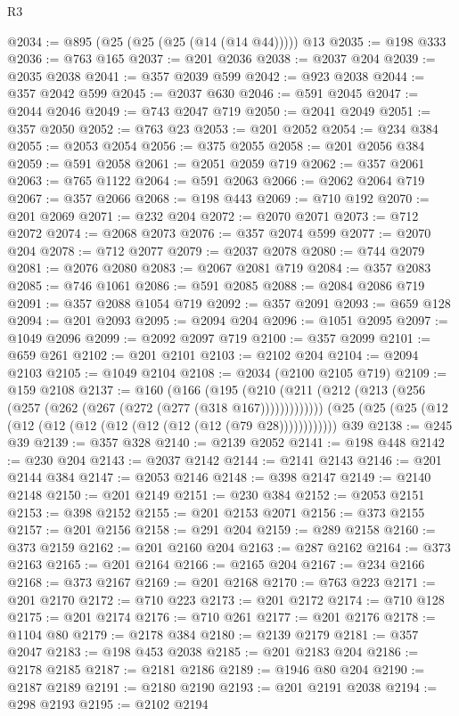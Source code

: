 \begin{lexlean}{R3}
\begin{coremodule}
@2034 := @895 (@25 (@25 (@25 (@14 (@14 @44))))) @13
@2035 := @198 @333
@2036 := @763 @165
@2037 := @201 @2036
@2038 := @2037 @204
@2039 := @2035 @2038
@2041 := @357 @2039 @599
@2042 := @923 @2038
@2044 := @357 @2042 @599
@2045 := @2037 @630
@2046 := @591 @2045
@2047 := @2044 @2046
@2049 := @743 @2047 @719
@2050 := @2041 @2049
@2051 := @357 @2050
@2052 := @763 @23
@2053 := @201 @2052
@2054 := @234 @384
@2055 := @2053 @2054
@2056 := @375 @2055
@2058 := @201 @2056 @384
@2059 := @591 @2058
@2061 := @2051 @2059 @719
@2062 := @357 @2061
@2063 := @765 @1122
@2064 := @591 @2063
@2066 := @2062 @2064 @719
@2067 := @357 @2066
@2068 := @198 @443
@2069 := @710 @192
@2070 := @201 @2069
@2071 := @232 @204
@2072 := @2070 @2071
@2073 := @712 @2072
@2074 := @2068 @2073
@2076 := @357 @2074 @599
@2077 := @2070 @204
@2078 := @712 @2077
@2079 := @2037 @2078
@2080 := @744 @2079
@2081 := @2076 @2080
@2083 := @2067 @2081 @719
@2084 := @357 @2083
@2085 := @746 @1061
@2086 := @591 @2085
@2088 := @2084 @2086 @719
@2091 := @357 @2088 @1054 @719
@2092 := @357 @2091
@2093 := @659 @128
@2094 := @201 @2093
@2095 := @2094 @204
@2096 := @1051 @2095
@2097 := @1049 @2096
@2099 := @2092 @2097 @719
@2100 := @357 @2099
@2101 := @659 @261
@2102 := @201 @2101
@2103 := @2102 @204
@2104 := @2094 @2103
@2105 := @1049 @2104
@2108 := @2034 (@2100 @2105 @719)
@2109 := @159 @2108
@2137 := @160
    (@166 (@195 (@210 (@211 (@212 (@213 (@256 (@257 (@262 (@267 (@272 (@277 (@318 @167)))))))))))))
    (@25 (@25 (@25 (@12 (@12 (@12 (@12 (@12 (@12 (@12 (@12 (@79 @28))))))))))))
    @39
@2138 := @245 @39
@2139 := @357 @328
@2140 := @2139 @2052
@2141 := @198 @448
@2142 := @230 @204
@2143 := @2037 @2142
@2144 := @2141 @2143
@2146 := @201 @2144 @384
@2147 := @2053 @2146
@2148 := @398 @2147
@2149 := @2140 @2148
@2150 := @201 @2149
@2151 := @230 @384
@2152 := @2053 @2151
@2153 := @398 @2152
@2155 := @201 @2153 @2071
@2156 := @373 @2155
@2157 := @201 @2156
@2158 := @291 @204
@2159 := @289 @2158
@2160 := @373 @2159
@2162 := @201 @2160 @204
@2163 := @287 @2162
@2164 := @373 @2163
@2165 := @201 @2164
@2166 := @2165 @204
@2167 := @234 @2166
@2168 := @373 @2167
@2169 := @201 @2168
@2170 := @763 @223
@2171 := @201 @2170
@2172 := @710 @223
@2173 := @201 @2172
@2174 := @710 @128
@2175 := @201 @2174
@2176 := @710 @261
@2177 := @201 @2176
@2178 := @1104 @80
@2179 := @2178 @384
@2180 := @2139 @2179
@2181 := @357 @2047
@2183 := @198 @453 @2038
@2185 := @201 @2183 @204
@2186 := @2178 @2185
@2187 := @2181 @2186
@2189 := @1946 @80 @204
@2190 := @2187 @2189
@2191 := @2180 @2190
@2193 := @201 @2191 @2038
@2194 := @298 @2193
@2195 := @2102 @2194

\end{coremodule}
\end{lexlean}
